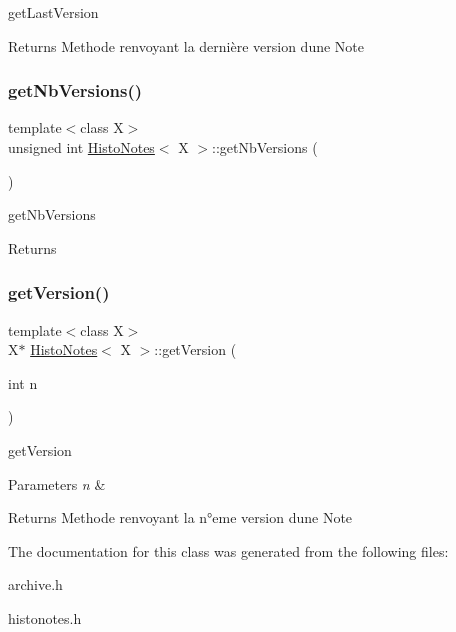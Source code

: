 get\+Last\+Version 

\begin{DoxyReturn}{Returns}
Methode renvoyant la dernière version d\textquotesingle{}une Note 
\end{DoxyReturn}
\mbox{\label{class_histo_notes_acfc34a454bc439ac6d1c282932667e1f}} 
\subsubsection{\texorpdfstring{get\+Nb\+Versions()}{getNbVersions()}}
{\footnotesize\ttfamily template$<$class X$>$ \\
unsigned int \hyperlink{class_histo_notes}{Histo\+Notes}$<$ X $>$\+::get\+Nb\+Versions (\begin{DoxyParamCaption}{ }\end{DoxyParamCaption})\hspace{0.3cm}{\ttfamily [inline]}}



get\+Nb\+Versions 

\begin{DoxyReturn}{Returns}

\end{DoxyReturn}
\mbox{\label{class_histo_notes_a08df51f5f3ce7f4b275b0295b43ef75d}} 
\subsubsection{\texorpdfstring{get\+Version()}{getVersion()}}
{\footnotesize\ttfamily template$<$class X$>$ \\
X$\ast$ \hyperlink{class_histo_notes}{Histo\+Notes}$<$ X $>$\+::get\+Version (\begin{DoxyParamCaption}\item[{int}]{n }\end{DoxyParamCaption})\hspace{0.3cm}{\ttfamily [inline]}}



get\+Version 


\begin{DoxyParams}{Parameters}
{\em n} & \\
\hline
\end{DoxyParams}
\begin{DoxyReturn}{Returns}
Methode renvoyant la n°eme version d\textquotesingle{}une Note 
\end{DoxyReturn}


The documentation for this class was generated from the following files\+:\begin{DoxyCompactItemize}
\item 
archive.\+h\item 
histonotes.\+h\end{DoxyCompactItemize}
